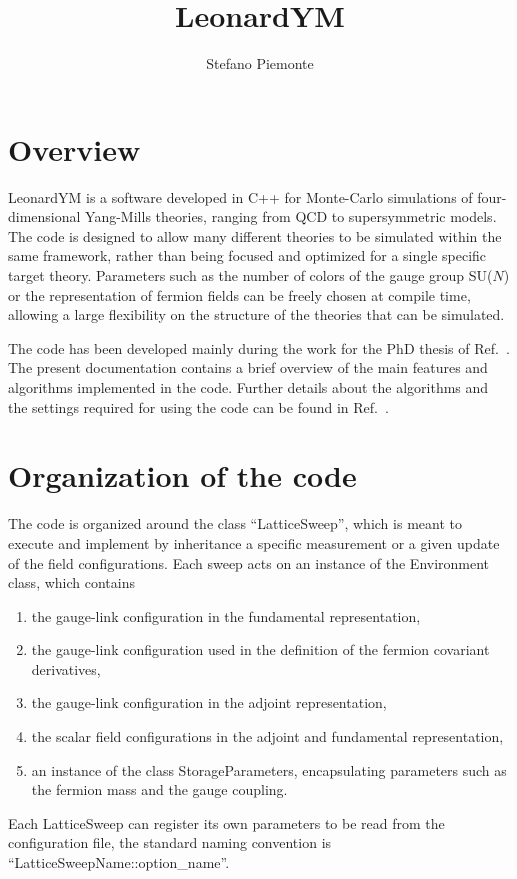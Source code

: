 \documentclass[11pt,a4paper]{article}
\title{LeonardYM}
\author{Stefano Piemonte}
\begin{document}
\maketitle

\section{Overview}

LeonardYM is a software developed in C++ for Monte-Carlo simulations of four-dimensional Yang-Mills theories, ranging from QCD to supersymmetric models. The code is designed to allow many different theories to be simulated within the same framework, rather than being focused and optimized for a single specific target theory. Parameters such as the number of colors of the gauge group SU($N$) or the representation of fermion fields can be freely chosen at compile time, allowing a large flexibility on the structure of the theories that can be simulated.

The code has been developed mainly during the work for the PhD thesis of Ref.~\cite{PIE15}. The present documentation contains a brief overview of the main features and algorithms implemented in the code. Further details about the algorithms and the settings required for using the code can be found in Ref.~\cite{PIE15,MON97,SAJ19}.

\section{Organization of the code}

The code is organized around the class ``LatticeSweep'', which is meant to execute and implement by inheritance a specific measurement or a given update of the field configurations. Each sweep acts on an instance of the Environment class, which contains
\begin{enumerate}
 \item the gauge-link configuration in the fundamental representation,
 \item the gauge-link configuration used in the definition of the fermion covariant derivatives,
 \item the gauge-link configuration in the adjoint representation,
 \item the scalar field configurations in the adjoint and fundamental representation,
 \item an instance of the class StorageParameters, encapsulating parameters such as the fermion mass and the gauge coupling.
\end{enumerate}
Each LatticeSweep can register its own parameters to be read from the configuration file, the standard naming convention is ``LatticeSweepName::option\_name''.
\end{document}
